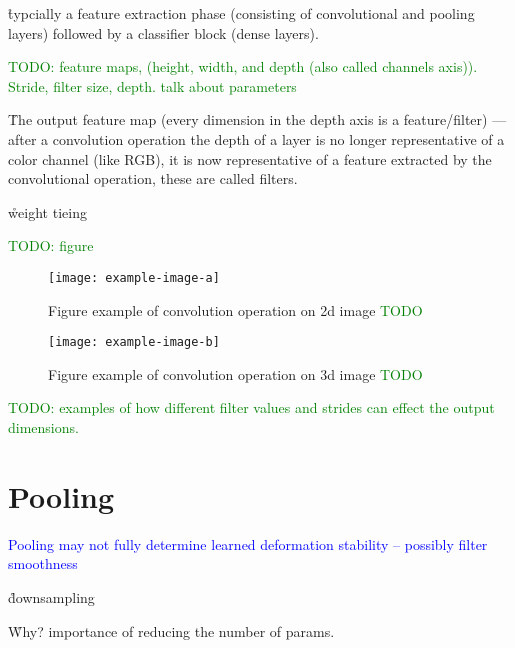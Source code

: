 \r{typcially a feature extraction phase (consisting of convolutional and pooling layers) followed by a classifier block (dense layers).}

\textcolor{green}{TODO: feature maps, (height, width, and depth (also called channels axis)). Stride, filter size, depth. talk about parameters}

\r{The output feature map (every dimension in the depth axis is a feature/filter) --- after a convolution operation the depth of a layer is no longer representative of a color channel (like RGB), it is now representative of a feature extracted by the convolutional operation, these are called filters.}



\r{weight tieing}


\textcolor{green}{TODO: figure}

\begin{figure}[htp]
	\centering
	\texttt{[image: example-image-a]}\hfil
	\caption{Figure example of convolution operation on 2d image \textcolor{green}{TODO}}
	\label{fig:conv_2d_example_calc}
\end{figure}

\begin{figure}[htp]
	\centering
	\texttt{[image: example-image-b]}\hfil
	\caption{Figure example of convolution operation on 3d image \textcolor{green}{TODO}}
	\label{fig:conv_2d_depth_example_calc}
\end{figure}

\textcolor{green}{TODO: examples of how different filter values and strides can effect the output dimensions.}




\section{Pooling}


\textcolor{blue}{Pooling may not fully determine learned deformation stability -- possibly filter smoothness\cite{ruderman2018learned}}

\r{downsampling}

\r{Why? importance of reducing the number of params.}

